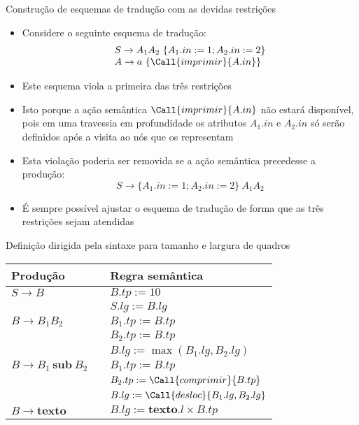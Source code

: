 \begin{frame}[fragile]{Construção de esquemas de tradução com as devidas restrições}

    \begin{itemize}
        \item Considere o seguinte esquema de tradução:
        \[
            \begin{array}{l}
                S\to A_1A_2\ \{A_1.in := 1; A_2.in := 2\} \\
                A \to a\ \{\Call{imprimir}{A.in}\}
            \end{array}
        \]
        \pause

        \item Este esquema viola a primeira das três restrições
        \pause

        \item Isto porque a ação semântica $\Call{imprimir}{A.in}$ não estará disponível, pois em uma travessia em profundidade os atributos $A_1.in$ e $A_2.in$
            só serão definidos após a visita ao nós que os representam
        \pause

        \item Esta violação poderia ser removida se a ação semântica precedesse a produção:
        \[
                S\to \{A_1.in := 1; A_2.in := 2\}\ A_1A_2
        \] \pause

        \item É sempre possível ajustar o esquema de tradução de forma que as três restrições sejam atendidas
    \end{itemize}

\end{frame}

\begin{frame}[fragile]{Definição dirigida pela sintaxe para tamanho e largura de quadros}

    \begin{table}[h]
        \begin{tabular}{lp{2cm}l}
            \toprule
            \textbf{Produção} & & \textbf{Regra semântica} \\
            \midrule
            $S\to B$ & & $B.tp := 10$ \\
            & & $S.lg := B.lg$ \\
            \midrule
            $B\to B_1B_2$ & & $B_1.tp := B.tp$ \\
            & & $B_2.tp := B.tp$ \\
            & & $B.lg := \max(B_1.lg, B_2.lg)$\\
            \midrule
            $B\to B_1\ \textbf{sub}\ B_2$ & & $B_1.tp := B.tp$ \\
            & & $B_2.tp := \Call{comprimir}{B.tp}$ \\
            & & $B.lg := \Call{desloc}{B_1.lg, B_2.lg}$\\
            \midrule
            $B\to \textbf{texto}$ & & $B.lg := \textbf{texto}.l \times B.tp$ \\
            \bottomrule
        \end{tabular}
    \end{table}


\end{frame}

